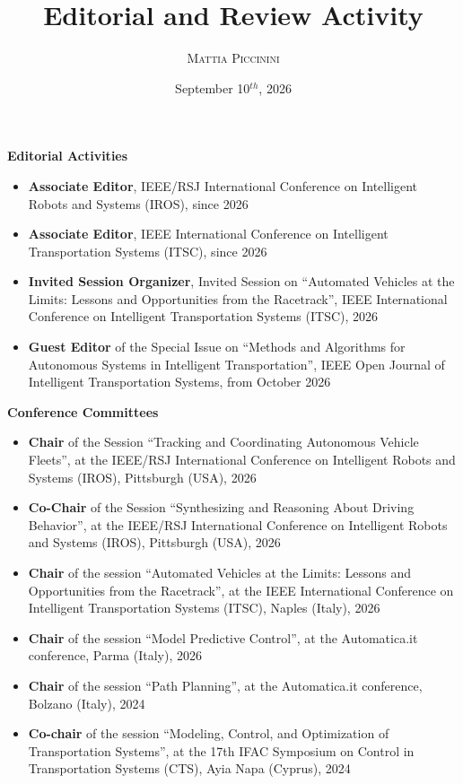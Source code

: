 \documentclass{article}
\title{Editorial and Review Activity} %
\author{%
\textsc{\Large Mattia Piccinini} \\[1ex] %
}
\date{September 10$^{th}$, 2026}
\begin{document}
\maketitle

\thispagestyle{empty}

\begin{center}
\Large\textbf{Editorial Activities}
\end{center}

\begin{itemize}
    \item \textbf{Associate Editor}, IEEE/RSJ International Conference on Intelligent Robots and Systems (IROS), since 2026
    \item \textbf{Associate Editor}, IEEE International Conference on Intelligent Transportation Systems (ITSC), since 2026
    \item \textbf{Invited Session Organizer}, Invited Session on ``Automated Vehicles at the Limits: Lessons and Opportunities from the Racetrack'', IEEE International Conference on Intelligent Transportation Systems (ITSC), 2026
    \item \textbf{Guest Editor} of the Special Issue on ``Methods and Algorithms for Autonomous Systems in Intelligent Transportation'', IEEE Open Journal of Intelligent Transportation Systems, from October 2026
\end{itemize}

\vspace{0.2cm}
\begin{center}
\Large\textbf{Conference Committees}
\end{center}

\begin{itemize}
    \item \textbf{Chair} of the Session ``Tracking and Coordinating Autonomous Vehicle Fleets'', at the IEEE/RSJ International Conference on Intelligent Robots and Systems (IROS), Pittsburgh (USA), 2026
    \item \textbf{Co-Chair} of the Session ``Synthesizing and Reasoning About Driving Behavior'', at the IEEE/RSJ International Conference on Intelligent Robots and Systems (IROS), Pittsburgh (USA), 2026
    \item \textbf{Chair} of the session ``Automated Vehicles at the Limits: Lessons and Opportunities from the Racetrack'', at the IEEE International Conference on Intelligent Transportation Systems (ITSC), Naples (Italy), 2026
    \item \textbf{Chair} of the session ``Model Predictive Control'', at the Automatica.it conference, Parma (Italy), 2026
    \item \textbf{Chair} of the session ``Path Planning'', at the Automatica.it conference, Bolzano (Italy), 2024
    \item \textbf{Co-chair} of the session ``Modeling, Control, and Optimization of Transportation Systems'', at the 17th IFAC Symposium on Control in Transportation Systems (CTS), Ayia Napa (Cyprus), 2024
\end{itemize}
\end{document}
